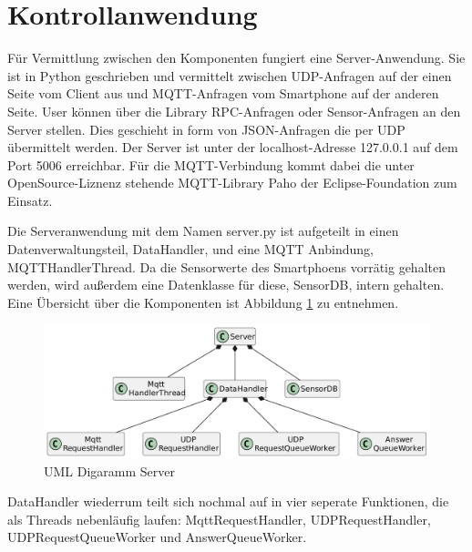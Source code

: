 \documentclass[11pt,a4paper]{report}
\begin{document}
\section{Kontrollanwendung}\label{chap:server_software}

Für Vermittlung zwischen den Komponenten fungiert eine Server-Anwendung.
Sie ist in Python geschrieben und vermittelt zwischen UDP-Anfragen auf der einen Seite vom Client aus und MQTT-Anfragen vom Smartphone auf der anderen Seite.
User können über die Library RPC-Anfragen oder Sensor-Anfragen an den Server stellen.
Dies geschieht in form von JSON-Anfragen die per UDP übermittelt werden.
Der Server ist unter der localhost-Adresse 127.0.0.1 auf dem Port 5006 erreichbar.
Für die MQTT-Verbindung kommt dabei die unter OpenSource-Liznenz stehende MQTT-Library Paho der Eclipse-Foundation zum Einsatz. \cite{paho}

Die Serveranwendung mit dem Namen server.py ist aufgeteilt in einen Datenverwaltungsteil, DataHandler, und eine MQTT Anbindung, MQTTHandlerThread.
Da die Sensorwerte des Smartphoens vorrätig gehalten werden, wird außerdem eine Datenklasse für diese, SensorDB, intern gehalten.
Eine Übersicht über die Komponenten ist Abbildung \ref{fig:serverUml} zu entnehmen.
\begin{figure}[htbp]
  \centering
  \includegraphics[width=\textwidth]{images/ServerUml}
  \caption{UML Digaramm Server}
  \label{fig:serverUml}
\end{figure}
DataHandler wiederrum teilt sich nochmal auf in vier seperate Funktionen, die als Threads nebenläufig laufen: MqttRequestHandler, UDPRequestHandler, UDPRequestQueueWorker und AnswerQueueWorker.
\end{document}
